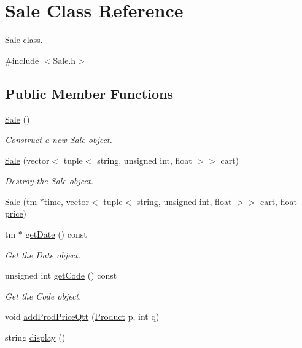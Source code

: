 \hypertarget{classSale}{}\section{Sale Class Reference}
\label{classSale}


\hyperlink{classSale}{Sale} class.  




{\ttfamily \#include $<$Sale.\+h$>$}

\subsection*{Public Member Functions}
\begin{DoxyCompactItemize}
\item 
\hyperlink{classSale_a4b941c26295df31d639351b276a11956}{Sale} ()
\begin{DoxyCompactList}\small\item\em Construct a new \hyperlink{classSale}{Sale} object. \end{DoxyCompactList}\item 
\hyperlink{classSale_a69f5e59b612e42837898b951ea08c3b7}{Sale} (vector$<$ tuple$<$ string, unsigned int, float $>$$>$ cart)
\begin{DoxyCompactList}\small\item\em Destroy the \hyperlink{classSale}{Sale} object. \end{DoxyCompactList}\item 
\hyperlink{classSale_ac832a81dfbb1a6130c4b50675c5533db}{Sale} (tm $\ast$time, vector$<$ tuple$<$ string, unsigned int, float $>$$>$ cart, float \hyperlink{classSale_a7fcb726755f9a802c21c1ecef5fc5753}{price})
\item 
tm $\ast$ \hyperlink{classSale_a7dbd53790d4cbd1d04163f3ace444122}{get\+Date} () const
\begin{DoxyCompactList}\small\item\em Get the Date object. \end{DoxyCompactList}\item 
unsigned int \hyperlink{classSale_a0f4f6f985ba28b31fc56adfac37bc952}{get\+Code} () const
\begin{DoxyCompactList}\small\item\em Get the Code object. \end{DoxyCompactList}\item 
void \hyperlink{classSale_ad582ae56bc2aa780b428e31de213a192}{add\+Prod\+Price\+Qtt} (\hyperlink{classProduct}{Product} p, int q)
\item 
string \hyperlink{classSale_af237ba4edbb4747b5d325fa7d60de179}{display} ()
\end{DoxyCompactItemize}
